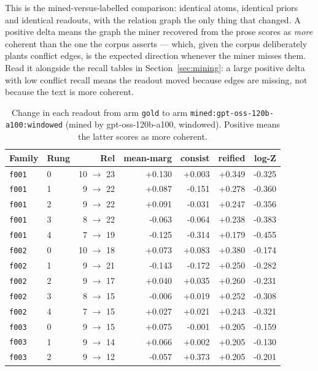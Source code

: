 \documentclass[11pt]{article}
\begin{document}
This is the mined-versus-labelled comparison: identical atoms, identical priors and identical readouts, with the relation graph the only thing that changed. A positive delta means the graph the miner recovered from the prose scores as \emph{more} coherent than the one the corpus asserts --- which, given the corpus deliberately plants conflict edges, is the expected direction whenever the miner misses them. Read it alongside the recall tables in Section~\ref{sec:mining}: a large positive delta with low conflict recall means the readout moved because edges are missing, not because the text is more coherent.

\begin{table}[htbp]
\centering
\small
\caption{Change in each readout from arm \texttt{gold} to arm \texttt{mined:gpt-oss-120b-a100:windowed} (mined by gpt-oss-120b-a100, windowed). Positive means the latter scores as more coherent.}
\label{tab:arm-delta-gold-mined-gpt-oss-120b-a100-windowed}
\begin{tabular}{llrrrrr}
\toprule
Family & Rung & Rel & \textbf{mean-marg} & \textbf{consist} & \textbf{reified} & \textbf{log-Z} \\
\midrule
\texttt{f001} & 0 & 10 $\to$ 23 & +0.130 & +0.003 & +0.349 & -0.325 \\
\texttt{f001} & 1 & 9 $\to$ 22 & +0.087 & -0.151 & +0.278 & -0.360 \\
\texttt{f001} & 2 & 9 $\to$ 22 & +0.091 & -0.031 & +0.247 & -0.356 \\
\texttt{f001} & 3 & 8 $\to$ 22 & -0.063 & -0.064 & +0.238 & -0.383 \\
\texttt{f001} & 4 & 7 $\to$ 19 & -0.125 & -0.314 & +0.179 & -0.455 \\
\texttt{f002} & 0 & 10 $\to$ 18 & +0.073 & +0.083 & +0.380 & -0.174 \\
\texttt{f002} & 1 & 9 $\to$ 21 & -0.143 & -0.172 & +0.250 & -0.282 \\
\texttt{f002} & 2 & 9 $\to$ 17 & +0.040 & +0.035 & +0.260 & -0.231 \\
\texttt{f002} & 3 & 8 $\to$ 15 & -0.006 & +0.019 & +0.252 & -0.308 \\
\texttt{f002} & 4 & 7 $\to$ 15 & +0.027 & +0.021 & +0.243 & -0.321 \\
\texttt{f003} & 0 & 9 $\to$ 15 & +0.075 & -0.001 & +0.205 & -0.159 \\
\texttt{f003} & 1 & 9 $\to$ 14 & +0.066 & +0.002 & +0.205 & -0.130 \\
\texttt{f003} & 2 & 9 $\to$ 12 & -0.057 & +0.373 & +0.205 & -0.201 \\

\end{tabular}
\end{table}
\end{document}
